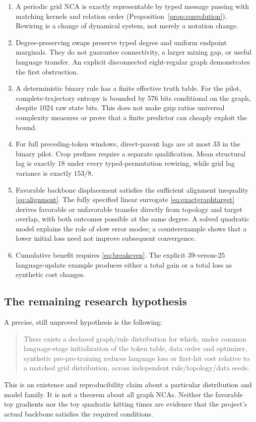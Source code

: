 \begin{enumerate}
 \item A periodic grid NCA is exactly representable by typed message
 passing with matching kernels and relation order
 (Proposition~\ref{prop:convolution}).
 Rewiring is a change of dynamical system, not merely a notation change.

 \item Degree-preserving swaps preserve typed degree and uniform
 endpoint marginals. They do not guarantee connectivity, a larger
 mixing gap, or useful language transfer. An explicit disconnected
 eight-regular graph demonstrates the first obstruction.

 \item A deterministic binary rule has a finite effective truth table.
 For the pilot, complete-trajectory entropy is bounded by 576 bits
 conditional on the graph, despite 1024 raw state bits.
 This does not make gzip ratios universal complexity measures or prove
 that a finite predictor can cheaply exploit the bound.

 \item For full preceding-token windows, direct-parent lags are at most
 33 in the binary pilot. Crop prefixes require a separate qualification.
 Mean structural lag is exactly 18 under every typed-permutation
 rewiring, while grid lag variance is exactly $153/8$.

 \item Favorable backbone displacement satisfies the sufficient
 alignment inequality \eqref{eq:alignment}.
 The fully specified linear surrogate \eqref{eq:exactgraphtarget}
 derives favorable or unfavorable transfer directly from topology and
 target overlap, with both outcomes possible at the same degree.
 A solved quadratic model explains the role of slow error modes;
 a counterexample shows that a lower initial loss need not improve
 subsequent convergence.

 \item Cumulative benefit requires \eqref{eq:breakeven}.
 The explicit $39$-versus-$25$ language-update example produces either
 a total gain or a total loss as synthetic cost changes.
\end{enumerate}

\subsection{The remaining research hypothesis}

A precise, still unproved hypothesis is the following:
\begin{quote}
There exists a declared graph/rule distribution for which, under common
language-stage initialization of the token table, data order and
optimizer, synthetic pre-pre-training reduces language loss or first-hit
cost relative to a matched grid distribution, across independent
rule/topology/data seeds.
\end{quote}
This is an existence and reproducibility claim about a particular
distribution and model family. It is not a theorem about all graph NCAs.
Neither the favorable toy gradients nor the toy quadratic hitting times
are evidence that the project's actual backbone satisfies the required
conditions.

